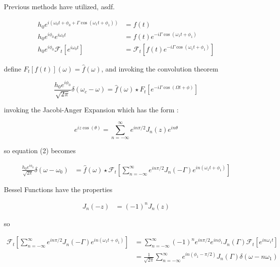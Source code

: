 \documentclass[onecolumn, groupedaddress, 10pt]{revtex4-1}
\begin{document}
Previous methods have utilized, asdf.

\begin{align}
h_0 e^{i\left( \omega_0 t + \phi_0 + \Gamma \cos (\omega_1 t + \phi_1 ) \right)} &= f(t) 												\\
h_0 e^{i\phi_0} e^{i\omega_0 t} &= f(t) e^{-i\Gamma \cos (\omega_1 t + \phi_1)}															\\
h_0 e^{i\phi_0} \mathcal{F}_t \left[ e^{i\omega_0 t} \right] &= \mathcal{F}_t \left[ f(t) e^{-i\Gamma \cos (\omega_1 t + \phi_1)} \right]
\end{align}

define $F_t[f(t)](\omega) = \hat{f}(\omega)$, and invoking the convolution theorem

\begin{equation}
\frac{h_0 e^{i\phi_0}}{\sqrt{2\pi}} \delta (\omega_c - \omega) = \hat{f}(\omega) \star F_t \left[ e^{-i\Gamma \cos (\Omega t + \phi)} \right]
\end{equation}

invoking the Jacobi-Anger Expansion which has the form \cite{}:

\begin{equation}
\label{eqn:jacobiAnger}
e^{iz\cos (\theta)} = \sum_{n=-\infty}^{\infty} e^{in\pi/2} J_n(z) e^{in\theta}
\end{equation}

so equation (2) becomes

\begin{align}
\frac{h_0 e^{i\phi_0}}{\sqrt{2\pi}} \delta (\omega - \omega_0)
&=
\hat{f}(\omega)
\star \mathcal{F}_t \left[ \sum_{n=-\infty}^{\infty} e^{in\pi/2} J_n(-\Gamma) e^{in(\omega_1 t + \phi_1)} \right]
\end{align}

Bessel Functions have the properties

\begin{align}
	J_n(-z) &= (-1)^n J_n(z)
\end{align}

so 

\begin{align}
\mathcal{F}_t \left[ \sum_{n=-\infty}^{\infty} e^{in\pi/2} J_n(-\Gamma) e^{in(\omega_1 t + \phi_1)} \right]
&= \sum_{n=-\infty}^{\infty} (-1)^n e^{in\pi/2} e^{in\phi_1} J_n(\Gamma) \mathcal{F}_t \left[e^{in\omega_1 t} \right]	 \\
&= \frac{1}{\sqrt{2\pi}}\sum_{n=-\infty}^{\infty} e^{in(\phi_1 - \pi/2)} J_n(\Gamma) \delta (\omega - n\omega_1)
\end{align}
\end{document}
